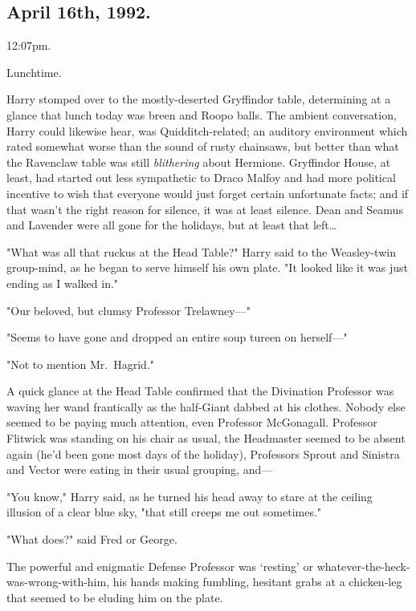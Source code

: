 
\subsection{April 16th, 1992.}

12:07pm.

Lunchtime.

Harry stomped over to the mostly-deserted Gryffindor table, determining at a 
glance that lunch today was breen and Roopo balls. The ambient conversation, 
Harry could likewise hear, was Quidditch-related; an auditory environment which 
rated somewhat worse than the sound of rusty chainsaws, but better than what 
the Ravenclaw table was still \emph{blithering} about Hermione. Gryffindor 
House, at least, had started out less sympathetic to Draco Malfoy and had more 
political incentive to wish that everyone would just forget certain unfortunate 
facts; and if that wasn't the right reason for silence, it was at least 
silence. Dean and Seamus and Lavender were all gone for the holidays, but at 
least that left{\ldots}

"What was all that ruckus at the Head Table?" Harry said to the Weasley-twin 
group-mind, as he began to serve himself his own plate. "It looked like it was 
just ending as I walked in."

"Our beloved, but clumsy Professor Trelawney---"

"Seems to have gone and dropped an entire soup tureen on herself---"

"Not to mention Mr.~Hagrid."

A quick glance at the Head Table confirmed that the Divination Professor was 
waving her wand frantically as the half-Giant dabbed at his clothes. Nobody 
else seemed to be paying much attention, even Professor McGonagall. Professor 
Flitwick was standing on his chair as usual, the Headmaster seemed to be absent 
again (he'd been gone most days of the holiday), Professors Sprout and Sinistra 
and Vector were eating in their usual grouping, and---

"You know," Harry said, as he turned his head away to stare at the ceiling 
illusion of a clear blue sky, "that still creeps me out sometimes."

"What does?" said Fred or George.

The powerful and enigmatic Defense Professor was `resting' or 
whatever-the-heck-was-wrong-with-him, his hands making fumbling, hesitant grabs 
at a chicken-leg that seemed to be eluding him on the plate.

